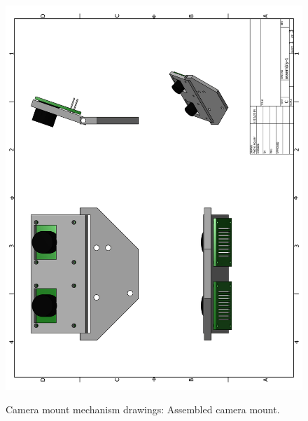 \begin{figure}[ht!]
\begin{center}
\includegraphics[height=1.2\textwidth]{fig/cammountp1}\\
\caption[Drawing. Assembled camera mount.]{Camera mount mechanism drawings: Assembled camera mount.}
\label{fig_cammountp1}
\end{center}
\end{figure}
